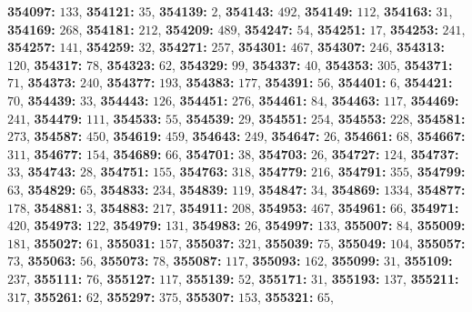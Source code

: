 \textsf{\bfseries 354097:} $133$, \textsf{\bfseries 354121:} $35$, \textsf{\bfseries 354139:} $2$, \textsf{\bfseries 354143:} $492$, \textsf{\bfseries 354149:} $112$, \textsf{\bfseries 354163:} $31$, \textsf{\bfseries 354169:} $268$, \textsf{\bfseries 354181:} $212$, \textsf{\bfseries 354209:} $489$, \textsf{\bfseries 354247:} $54$, \textsf{\bfseries 354251:} $17$, \textsf{\bfseries 354253:} $241$, \textsf{\bfseries 354257:} $141$, \textsf{\bfseries 354259:} $32$, \textsf{\bfseries 354271:} $257$, \textsf{\bfseries 354301:} $467$, \textsf{\bfseries 354307:} $246$, \textsf{\bfseries 354313:} $120$, \textsf{\bfseries 354317:} $78$, \textsf{\bfseries 354323:} $62$, \textsf{\bfseries 354329:} $99$, \textsf{\bfseries 354337:} $40$, \textsf{\bfseries 354353:} $305$, \textsf{\bfseries 354371:} $71$, \textsf{\bfseries 354373:} $240$, \textsf{\bfseries 354377:} $193$, \textsf{\bfseries 354383:} $177$, \textsf{\bfseries 354391:} $56$, \textsf{\bfseries 354401:} $6$, \textsf{\bfseries 354421:} $70$, \textsf{\bfseries 354439:} $33$, \textsf{\bfseries 354443:} $126$, \textsf{\bfseries 354451:} $276$, \textsf{\bfseries 354461:} $84$, \textsf{\bfseries 354463:} $117$, \textsf{\bfseries 354469:} $241$, \textsf{\bfseries 354479:} $111$, \textsf{\bfseries 354533:} $55$, \textsf{\bfseries 354539:} $29$, \textsf{\bfseries 354551:} $254$, \textsf{\bfseries 354553:} $228$, \textsf{\bfseries 354581:} $273$, \textsf{\bfseries 354587:} $450$, \textsf{\bfseries 354619:} $459$, \textsf{\bfseries 354643:} $249$, \textsf{\bfseries 354647:} $26$, \textsf{\bfseries 354661:} $68$, \textsf{\bfseries 354667:} $311$, \textsf{\bfseries 354677:} $154$, \textsf{\bfseries 354689:} $66$, \textsf{\bfseries 354701:} $38$, \textsf{\bfseries 354703:} $26$, \textsf{\bfseries 354727:} $124$, \textsf{\bfseries 354737:} $33$, \textsf{\bfseries 354743:} $28$, \textsf{\bfseries 354751:} $155$, \textsf{\bfseries 354763:} $318$, \textsf{\bfseries 354779:} $216$, \textsf{\bfseries 354791:} $355$, \textsf{\bfseries 354799:} $63$, \textsf{\bfseries 354829:} $65$, \textsf{\bfseries 354833:} $234$, \textsf{\bfseries 354839:} $119$, \textsf{\bfseries 354847:} $34$, \textsf{\bfseries 354869:} $1334$, \textsf{\bfseries 354877:} $178$, \textsf{\bfseries 354881:} $3$, \textsf{\bfseries 354883:} $217$, \textsf{\bfseries 354911:} $208$, \textsf{\bfseries 354953:} $467$, \textsf{\bfseries 354961:} $66$, \textsf{\bfseries 354971:} $420$, \textsf{\bfseries 354973:} $122$, \textsf{\bfseries 354979:} $131$, \textsf{\bfseries 354983:} $26$, \textsf{\bfseries 354997:} $133$, \textsf{\bfseries 355007:} $84$, \textsf{\bfseries 355009:} $181$, \textsf{\bfseries 355027:} $61$, \textsf{\bfseries 355031:} $157$, \textsf{\bfseries 355037:} $321$, \textsf{\bfseries 355039:} $75$, \textsf{\bfseries 355049:} $104$, \textsf{\bfseries 355057:} $73$, \textsf{\bfseries 355063:} $56$, \textsf{\bfseries 355073:} $78$, \textsf{\bfseries 355087:} $117$, \textsf{\bfseries 355093:} $162$, \textsf{\bfseries 355099:} $31$, \textsf{\bfseries 355109:} $237$, \textsf{\bfseries 355111:} $76$, \textsf{\bfseries 355127:} $117$, \textsf{\bfseries 355139:} $52$, \textsf{\bfseries 355171:} $31$, \textsf{\bfseries 355193:} $137$, \textsf{\bfseries 355211:} $317$, \textsf{\bfseries 355261:} $62$, \textsf{\bfseries 355297:} $375$, \textsf{\bfseries 355307:} $153$, \textsf{\bfseries 355321:} $65$, 
